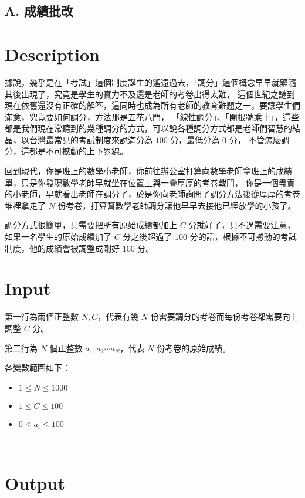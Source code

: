 \documentclass[11pt,a4paper]{article}
\begin{document}
\begin{center}
\section*{A. 成績批改}
\end{center}

\section*{Description}

據說，幾乎是在「考試」這個制度誕生的遙遠過去，「調分」這個概念早早就緊隨其後出現了，究竟是學生的實力不及還是老師的考卷出得太難，
這個世紀之謎到現在依舊還沒有正確的解答，這同時也成為所有老師的教育難題之一，要讓學生們滿意，究竟要如何調分，方法那是五花八門，
「線性調分」、「開根號乘十」，這些都是我們現在常聽到的幾種調分的方式，可以說各種調分方式都是老師們智慧的結晶，以台灣最常見的考試制度來說滿分為 $100$ 分，最低分為 $0$ 分，
不管怎麼調分，這都是不可撼動的上下界線。

回到現代，你是班上的數學小老師，你前往辦公室打算向數學老師拿班上的成績單，只是你發現數學老師早就坐在位置上與一疊厚厚的考卷戰鬥，
你是一個盡責的小老師，早就看出老師在調分了，於是你向老師詢問了調分方法後從厚厚的考卷堆裡拿走了 $N$ 份考卷，打算幫數學老師調分讓他早早去接他已經放學的小孩了。

調分方式很簡單，只需要把所有原始成績都加上 $C$ 分就好了，只不過需要注意，如果一名學生的原始成績加了 $C$ 分之後超過了 $100$ 分的話，根據不可撼動的考試制度，他的成績會被調整成剛好 $100$ 分。
	
\section*{Input}

第一行為兩個正整數 $N, C$，代表有幾 $N$ 份需要調分的考卷而每份考卷都需要向上調整 $C$ 分。

第二行為 $N$ 個正整數 $a_1 , a_2 \cdots a_N$，代表 $N$ 份考卷的原始成績。 

各變數範圍如下：
\begin{itemize}
    \item $1 \le N \le 1000$
    \item $1 \le C \le 100$
    \item $0 \le a_i \leq 100$
\end{itemize}\

\section*{Output}
\end{document}
